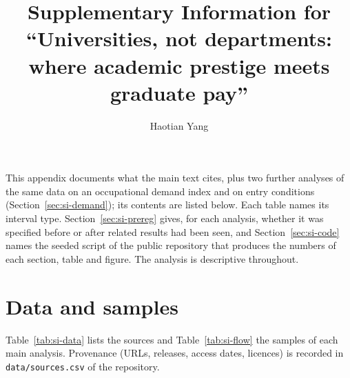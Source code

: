 \documentclass[11pt]{article}
\title{\bfseries Supplementary Information for\\ ``Universities, not departments: where academic
prestige meets graduate pay''}
\author{Haotian Yang}
\date{}
\begin{document}
\maketitle

\noindent This appendix documents what the main text cites, plus two further analyses of the same data on an
occupational demand index and on entry conditions (Section~\ref{sec:si-demand}); its contents are listed below. Each
table names its interval type. Section~\ref{sec:si-prereg} gives, for each analysis, whether it was specified before
or after related results had been seen, and Section~\ref{sec:si-code} names the seeded script of the public
repository that produces the numbers of each section, table and figure. The analysis is descriptive throughout.

\tableofcontents

\section{Data and samples}\label{sec:si-data}

Table~\ref{tab:si-data} lists the sources and Table~\ref{tab:si-flow} the samples of each main analysis. Provenance
(URLs, releases, access dates, licences) is recorded in \texttt{data/sources.csv} of the repository.
\end{document}
